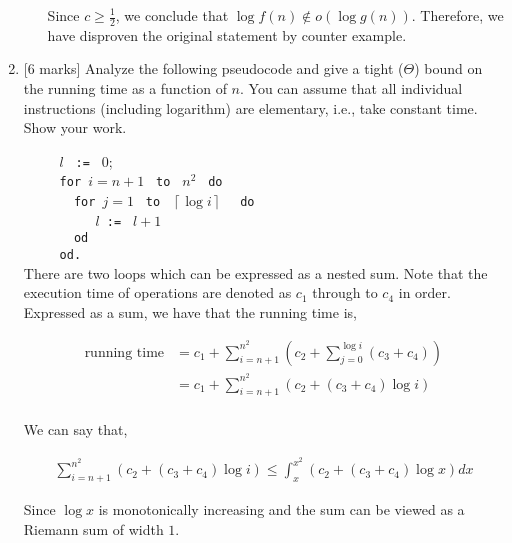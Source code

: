 \begin{enumerate}
\begin{enumerate}
                    Since $c \ge \frac{1}{2}$, we conclude that $\log{f \left( n \right)} \notin o\left( \log{g \left( n \right)} \right)$.
                    Therefore, we have disproven the original statement by counter example.

          \end{enumerate}
    \item {[6 marks]} Analyze the following pseudocode and give a tight ($\Theta$) bound on the running time
          as a function of $n$. You can assume that all individual instructions
          (including logarithm) are elementary, i.e., take constant time. Show your work.

          \verb|     |$l$ \verb| := | 0;\\
          \verb|     for |$i=n+1$ \verb| to | $ n^2 $ \verb| do |\\
          \verb|       for |$j=1$ \verb| to | $\left\lceil \log{i} \right\rceil$ \verb|  do |\\
          \verb|          |$l $\verb| := | $l+1$\\
          \verb|       od  |\\
          \verb|     od.|\\

          There are two loops which can be expressed as a nested sum. Note that the execution time of operations
          are denoted as $c_1$ through to $c_4$ in order. Expressed as a sum, we have that the running time is,

          \begin{align*}
              \text{running time} & = c_1 + \sum_{i=n+1}^{n^2} \left( c_2 + \sum_{j=0}^{\log{i}} \left( c_3 + c_4 \right) \right) \\
                                  & = c_1 + \sum_{i=n+1}^{n^2} \left( c_2 + \left( c_3 + c_4 \right) \log{i} \right)              \\
          \end{align*}

          We can say that,

          \begin{align*}
              \sum_{i=n+1}^{n^2} \left( c_2 + \left( c_3 + c_4 \right) \log{i} \right) \le \int_{x}^{x^2} \left( c_2 + \left( c_3 + c_4 \right) \log{x} \right) dx
          \end{align*}

          Since $\log{x}$ is monotonically increasing and the sum can be viewed as a Riemann sum of width $1$. \\


\end{enumerate}

